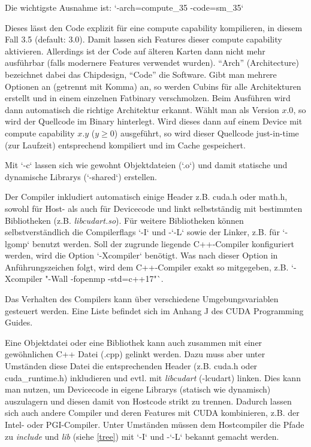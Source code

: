 			Die wichtigste Ausnahme ist: \li`-arch=compute_35 -code=sm_35`
		
			Dieses lässt den Code explizit für eine \gls{compute capability} kompilieren, in diesem Fall 3.5 (default: 3.0). Damit lassen sich Features dieser \gls{compute capability} aktivieren. Allerdings ist der Code auf älteren Karten dann nicht mehr ausführbar (falls modernere Features verwendet wurden). \enquote{Arch} (Architecture) bezeichnet dabei das Chipdesign, \enquote{Code} die Software. Gibt man mehrere Optionen an (getrennt mit Komma) an, so werden Cubins für alle Architekturen erstellt und in einem einzelnen Fatbinary verschmolzen. Beim Ausführen wird dann automatisch die richtige Architektur erkannt. Wählt man als Version $x.0$, so wird der Quellcode im Binary hinterlegt. Wird dieses dann auf einem Device mit \gls{compute capability} $x.y$ ($y \geq 0$) ausgeführt, so wird dieser Quellcode just-in-time (zur Laufzeit) entsprechend kompiliert und im Cache gespeichert. 
		
			Mit \li`-c` lassen sich wie gewohnt Objektdateien (\li`.o`) und damit statische und dynamische Librarys (\li`-shared`) erstellen.
		
			Der Compiler inkludiert automatisch einige Header z.B. cuda.h oder math.h, sowohl für Host- als auch für Devicecode und linkt selbstständig mit bestimmten Bibliotheken (z.B. \textit{libcudart.so}). Für weitere Bibliotheken können selbstverständlich die Compilerflags \li`-I` und -\li`-L` sowie der Linker, z.B. für \li`-lgomp` benutzt werden.
			Soll der zugrunde liegende C++-Compiler konfiguriert werden, wird die Option \li`-Xcompiler` benötigt. Was nach dieser Option in Anführungszeichen folgt, wird dem C++-Compiler exakt so mitgegeben, z.B. \li`-Xcompiler "-Wall -fopenmp -std=c++17"`.
		
			Das Verhalten des Compilers kann über verschiedene Umgebungsvariablen gesteuert werden. Eine Liste befindet sich im Anhang J des CUDA Programming Guides. \autocite{cudaPG} 
		
			Eine Objektdatei oder eine Bibliothek kann auch zusammen mit einer gewöhnlichen C++ Datei (.cpp) gelinkt werden. Dazu muss aber unter Umständen diese Datei die entsprechenden Header (z.B. cuda.h oder cuda{\_}runtime.h) inkludieren und evtl. mit \textit{libcudart} (-lcudart) linken. Dies kann man nutzen, um Devicecode in eigene Librarys (statisch wie dynamisch) auszulagern und diesen damit von Hostcode strikt zu trennen. Dadurch lassen sich auch andere Compiler und deren Features mit CUDA kombinieren, z.B. der Intel- oder PGI-Compiler. Unter Umständen müssen dem Hostcompiler die Pfade zu \textit{include} und \textit{lib} (siehe \ref{tree}) mit \li`-I` und -\li`-L` bekannt gemacht werden.
